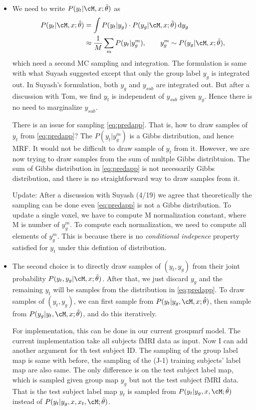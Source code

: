 \documentclass[12pt]{article}
\begin{document}
\begin{itemize}
  \item We need to write $P(y_t|\cM, x; \hat \theta)$ as
    \begin{align}
      P(y_t|\cM, x; \hat \theta) &= \int P(y_t | y_g) \cdot P(y_g |\cM, x; \hat \theta)\, \textrm{d} y_g \nonumber\\
      &\approx \frac{1}{M}\sum_m P(y_t| y_g^m), \qquad y_g^m \sim P(y_g | \cM, x; \hat \theta),\label{eq:predapp}
    \end{align}
    which need a second MC sampling and integration. The formulation is same
    with what Suyash suggested except that only the group label $y_g$ is
    integrated out. In Suyash's formulation, both $y_g$ and $y_{sub}$ are
    integrated out. But after a discussion with Tom, we find $y_t$ is
    independent of $y_{sub}$ given $y_g$. Hence there is no need to marginalize
    $y_{sub}$.

    There is an issue for sampling \eqref{eq:predapp}. That is, how to draw
    samples of $y_t$ from \eqref{eq:predapp}? The $P(y_t|y_g^m)$ is a Gibbs
    distribution, and hence MRF. It would not be difficult to draw sample of
    $y_t$ from it. However, we are now trying to draw samples from the sum of
    multple Gibbs distribtuion. The sum of Gibbs distribution in
    \eqref{eq:predapp} is not necessarily Gibbs distribution, and there is no
    straightforward way to draw samples from it. 

    Update: After a discussion with Suyash (4/19) we agree that theoretically the
    sampling can be done even \eqref{eq:predapp} is not a Gibbs distribution. To
    update a single voxel, we have to compute M normalization constant, where M
    is number of $y_g^m$. To compute each normalization, we need to compute all
    elements of $y_g^m$. This is because there is no \emph{conditional
      indepence} property satisfied for $y_t$ under this defintion of
    distribution.

  \item The second choice is to directly draw samples of $(y_t, y_g)$ from their
    joint probability $P(y_t, y_g | \cM, x; \hat \theta)$. After that, we just
    discard $y_g$ and the remaining $y_t$ will be samples from the distribution
    in \eqref{eq:predapp}. To draw samples of $(y_t, y_g)$, we can first sample
    from $P(y_t|y_g, \cM, x; \hat \theta)$, then sample from $P(y_g|y_t, \cM, x;
    \hat \theta)$, and do this iteratively. 

    For implementation, this can be done in our current \textsf{groupmrf}
    model. The current implementation take all subjects fMRI data as input. Now
    I can add another argument for th test subject ID. The sampling of the group
    label map is same with before, the sampling of the (J-1) training subjects'
    label map are also same. The only difference is on the test subject label
    map, which is sampled given group map $y_g$ but not the test subject fMRI
    data. That is the test subject label map $y_t$ is sampled from $P(y_t| y_g,
    x, \cM; \hat \theta)$ instead of $P(y_t | y_g, x, x_t, \cM;\hat \theta)$.


\end{itemize}
\end{document}
